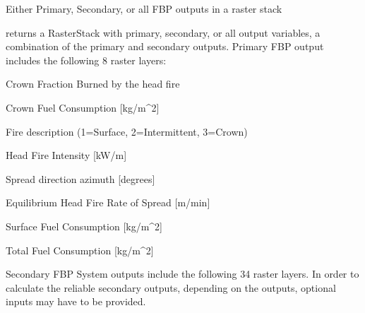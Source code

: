 \documentclass[a4paper]{book}
\begin{document}
\begin{Value}
Either Primary, Secondary, or all FBP outputs in a raster stack

 returns a RasterStack with primary, secondary, or 
all output variables, a combination of the primary and secondary outputs. 
Primary FBP output includes the following 8 raster layers: 

\begin{ldescription}
\item[\code{CFB}] Crown Fraction Burned by the head fire
\item[\code{CFC}] Crown Fuel Consumption [kg/m\textasciicircum{}2]
\item[\code{FD}] Fire description (1=Surface, 2=Intermittent, 3=Crown)
\item[\code{HFI}] Head Fire Intensity [kW/m]
\item[\code{RAZ}] Spread direction azimuth [degrees]
\item[\code{ROS}] Equilibrium Head Fire Rate of Spread [m/min]
\item[\code{SFC}] Surface Fuel Consumption [kg/m\textasciicircum{}2]
\item[\code{TFC}] Total Fuel Consumption [kg/m\textasciicircum{}2]

\end{ldescription}
Secondary FBP System outputs include the following 34 raster layers. In order 
to calculate the reliable secondary outputs, depending on the outputs, 
optional inputs may have to be provided.  


\end{Value}
\end{document}
